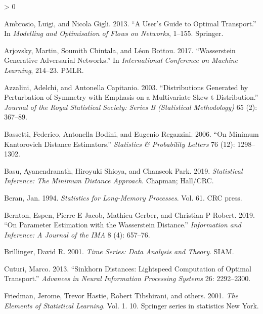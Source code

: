 \documentclass[
  11pt,
]{article}
\newlength{\cslhangindent}
\newenvironment{CSLReferences}[2] %
 {%
  \setlength{\parindent}{0pt}
  \ifodd #1 \everypar{\setlength{\hangindent}{\cslhangindent}}\ignorespaces\fi
  \ifnum #2 > 0
  \setlength{\parskip}{#2\baselineskip}
  \fi
 }%
 {}
\begin{document}
\hypertarget{refs}{}
\begin{CSLReferences}{1}{0}
\leavevmode\hypertarget{ref-ambrosio2013user}{}%
Ambrosio, Luigi, and Nicola Gigli. 2013. {``A User's Guide to Optimal
Transport.''} In \emph{Modelling and Optimisation of Flows on Networks},
1--155. Springer.

\leavevmode\hypertarget{ref-arjovsky2017wasserstein}{}%
Arjovsky, Martin, Soumith Chintala, and Léon Bottou. 2017.
{``Wasserstein Generative Adversarial Networks.''} In
\emph{International Conference on Machine Learning}, 214--23. PMLR.

\leavevmode\hypertarget{ref-azzalini2003distributions}{}%
Azzalini, Adelchi, and Antonella Capitanio. 2003. {``Distributions
Generated by Perturbation of Symmetry with Emphasis on a Multivariate
Skew t-Distribution.''} \emph{Journal of the Royal Statistical Society:
Series B (Statistical Methodology)} 65 (2): 367--89.

\leavevmode\hypertarget{ref-bassetti2006minimum}{}%
Bassetti, Federico, Antonella Bodini, and Eugenio Regazzini. 2006. {``On
Minimum Kantorovich Distance Estimators.''} \emph{Statistics \&
Probability Letters} 76 (12): 1298--1302.

\leavevmode\hypertarget{ref-basu2019statistical}{}%
Basu, Ayanendranath, Hiroyuki Shioya, and Chanseok Park. 2019.
\emph{Statistical Inference: The Minimum Distance Approach}. Chapman;
Hall/CRC.

\leavevmode\hypertarget{ref-beran1994statistics}{}%
Beran, Jan. 1994. \emph{Statistics for Long-Memory Processes}. Vol. 61.
CRC press.

\leavevmode\hypertarget{ref-bernton2019parameter}{}%
Bernton, Espen, Pierre E Jacob, Mathieu Gerber, and Christian P Robert.
2019. {``On Parameter Estimation with the Wasserstein Distance.''}
\emph{Information and Inference: A Journal of the IMA} 8 (4): 657--76.


\leavevmode\hypertarget{ref-brillinger2001time}{}%
Brillinger, David R. 2001. \emph{Time Series: Data Analysis and Theory}.
SIAM.

\leavevmode\hypertarget{ref-cuturi2013sinkhorn}{}%
Cuturi, Marco. 2013. {``Sinkhorn Distances: Lightspeed Computation of
Optimal Transport.''} \emph{Advances in Neural Information Processing
Systems} 26: 2292--2300.

\leavevmode\hypertarget{ref-friedman2001elements}{}%
Friedman, Jerome, Trevor Hastie, Robert Tibshirani, and others. 2001.
\emph{The Elements of Statistical Learning}. Vol. 1. 10. Springer series
in statistics New York.


\end{CSLReferences}
\end{document}
